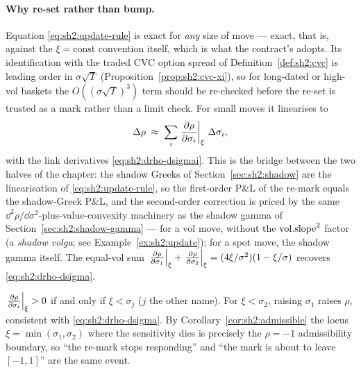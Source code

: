 \paragraph{Why re-set rather than bump.}
Equation \eqref{eq:sh2:update-rule} is exact for \emph{any} size of move
--- exact, that is, against the $\xi = \text{const}$ convention itself,
which is what the contract's \stickycvc{} adopts. Its identification with
the traded CVC option spread of Definition~\ref{def:sh2:cvc} is leading
order in $\sigma\sqrt{T}$ (Proposition~\ref{prop:sh2:cvc-xi}), so for
long-dated or high-vol baskets the $O((\sigma\sqrt{T})^3)$ term should be
re-checked before the re-set is trusted as a mark rather than a limit
check. For small moves it linearises to
\begin{equation}\label{eq:sh2:update-linear}
  \Delta\rho \;\approx\; \sum_{i}
  \left.\frac{\partial \rho}{\partial \sigma_i}\right|_{\xi}\, \Delta\sigma_i,
\end{equation}
with the link derivatives \eqref{eq:sh2:drho-dsigmai}. This is the bridge
between the two halves of the chapter: the shadow Greeks of
Section~\ref{sec:sh2:shadow} are the linearisation of
\eqref{eq:sh2:update-rule}, so the first-order P\&L of the re-mark equals
the shadow-Greek P\&L, and the second-order correction is priced by the
same $\dd^2\rho/\dd\sigma^2$-plus-value-convexity machinery as the shadow
gamma of Section~\ref{sec:sh2:shadow-gamma} --- for a vol move, without
the $\mathrm{vol.slope}^2$ factor (a \emph{shadow volga}; see
Example~\ref{ex:sh2:update}); for a spot move, the shadow gamma itself.
The equal-vol sum
$\left.\frac{\partial \rho}{\partial \sigma_1}\right|_{\xi} + \left.\frac{\partial \rho}{\partial \sigma_2}\right|_{\xi}
= (4\xi/\sigma^2)(1 - \xi/\sigma)$ recovers
\eqref{eq:sh2:drho-dsigma}.

\begin{remark}[Regularity]\label{rem:sh2:regularity}
$\left.\frac{\partial \rho}{\partial \sigma_i}\right|_{\xi} > 0$ if and only if $\xi < \sigma_j$
($j$ the other name). For $\xi < \sigma_2$, raising $\sigma_1$ raises
$\rho$, consistent with \eqref{eq:sh2:drho-dsigma}. By
Corollary~\ref{cor:sh2:admissible} the locus $\xi = \min(\sigma_1,
\sigma_2)$ where the sensitivity dies is precisely the $\rho = -1$
admissibility boundary, so ``the re-mark stops responding'' and ``the mark
is about to leave $[-1, 1]$'' are the same event.
\end{remark}

